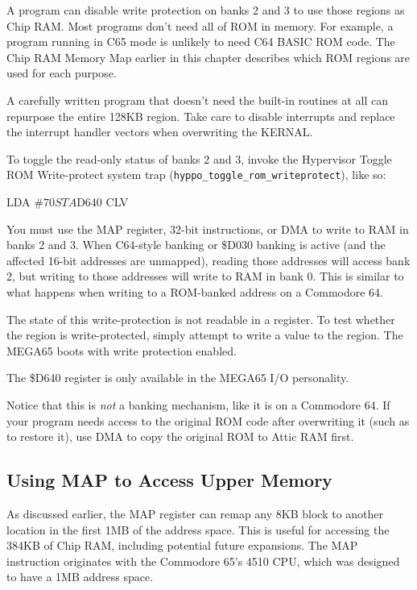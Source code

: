 A program can disable write protection on banks 2 and 3 to use those regions as Chip RAM. Most programs don't need all of ROM in memory. For example, a program running in C65 mode is unlikely to need C64 BASIC ROM code. The Chip RAM Memory Map earlier in this chapter describes which ROM regions are used for each purpose.

A carefully written program that doesn't need the built-in routines at all can repurpose the entire 128KB region. Take care to disable interrupts and replace the interrupt handler vectors when overwriting the KERNAL.

To toggle the read-only status of banks 2 and 3, invoke the Hypervisor Toggle ROM Write-protect system trap ({\tt hyppo\_toggle\_rom\_writeprotect}), like so:

\begin{asmcode}
LDA #$70
STA $D640
CLV
\end{asmcode}

You must use the MAP register, 32-bit instructions, or DMA to write to RAM in banks 2 and 3. When C64-style banking or \$D030 banking is active (and the affected 16-bit addresses are unmapped), reading those addresses will access bank 2, but writing to those addresses will write to RAM in bank 0. This is similar to what happens when writing to a ROM-banked address on a Commodore 64.

The state of this write-protection is not readable in a register. To test whether the region is write-protected, simply attempt to write a value to the region. The MEGA65 boots with write protection enabled.

The \$D640 register is only available in the MEGA65 I/O personality.

Notice that this is {\em not} a banking mechanism, like it is on a Commodore 64. If your program needs access to the original ROM code after overwriting it (such as to restore it), use DMA to copy the original ROM to Attic RAM first.

\subsection{Using MAP to Access Upper Memory}

As discussed earlier, the MAP register can remap any 8KB block to another location in the first 1MB of the address space. This is useful for accessing the 384KB of Chip RAM, including potential future expansions. The MAP instruction originates with the Commodore 65's 4510 CPU, which was designed to have a 1MB address space.


